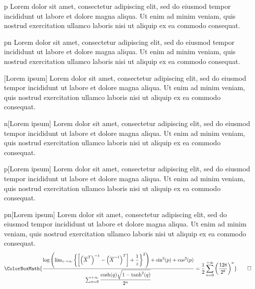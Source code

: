 \begin{exercise}{p}
	Lorem dolor sit amet, consectetur adipiscing elit, sed do eiusmod tempor incididunt ut labore et dolore magna aliqua. Ut enim ad minim veniam, quis nostrud exercitation ullamco laboris nisi ut aliquip ex ea commodo consequat.
\end{exercise}

\begin{exercise}{pn}
	Lorem dolor sit amet, consectetur adipiscing elit, sed do eiusmod tempor incididunt ut labore et dolore magna aliqua. Ut enim ad minim veniam, quis nostrud exercitation ullamco laboris nisi ut aliquip ex ea commodo consequat.
\end{exercise}

\begin{exercise}{}[Lorem ipsum]
	Lorem dolor sit amet, consectetur adipiscing elit, sed do eiusmod tempor incididunt ut labore et dolore magna aliqua. Ut enim ad minim veniam, quis nostrud exercitation ullamco laboris nisi ut aliquip ex ea commodo consequat.
\end{exercise}

\begin{exercise}{n}[Lorem ipsum]
	Lorem dolor sit amet, consectetur adipiscing elit, sed do eiusmod tempor incididunt ut labore et dolore magna aliqua. Ut enim ad minim veniam, quis nostrud exercitation ullamco laboris nisi ut aliquip ex ea commodo consequat.
\end{exercise}

\begin{exercise}{p}[Lorem ipsum]
	Lorem dolor sit amet, consectetur adipiscing elit, sed do eiusmod tempor incididunt ut labore et dolore magna aliqua. Ut enim ad minim veniam, quis nostrud exercitation ullamco laboris nisi ut aliquip ex ea commodo consequat.
\end{exercise}

\begin{exercise}{pn}[Lorem ipsum]
	Lorem dolor sit amet, consectetur adipiscing elit, sed do eiusmod tempor incididunt ut labore et dolore magna aliqua. Ut enim ad minim veniam, quis nostrud exercitation ullamco laboris nisi ut aliquip ex ea commodo consequat.
	\begin{equation*}
		\ColorBoxMath{\dfrac{\log\left(\lim_{z\to\infty}\left\{\left[\left(\overline{X}^{T}\right)^{-1}-\left(\overline{X}^{-1}\right)^T\right]+\dfrac{1}{z}\right\}^2\right)+\sin^2(p)+\cos^2(p)}{\sum_{n=0}^{+\infty}\dfrac{\cosh(q)\sqrt{1-\tanh^2(q)}}{2^n}}=\dfrac{1}{2}\sum_{n=0}^{+\infty}\left(\dfrac{128}{2^8}\right)^n}\qedhere
	\end{equation*}
\end{exercise}

